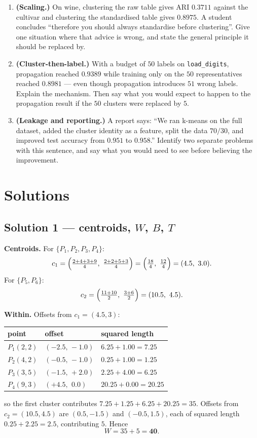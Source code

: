 \documentclass[11pt]{article}
\begin{document}
\begin{enumerate}[leftmargin=*]
  \item \textbf{(Scaling.)} On wine, clustering the raw table gives ARI
    $0.3711$ against the cultivar and clustering the standardised table gives
    $0.8975$. A student concludes ``therefore you should always
    standardise before clustering''. Give one situation where that advice is
    wrong, and state the general principle it should be replaced by.

  \item \textbf{(Cluster-then-label.)} With a budget of $50$ labels on
    \texttt{load\_digits}, propagation reached $0.9389$ while training only on
    the $50$ representatives reached $0.8981$ --- even though propagation
    introduces $51$ wrong labels. Explain the mechanism. Then say what you
    would expect to happen to the propagation result if the $50$ clusters were
    replaced by $5$.

  \item \textbf{(Leakage and reporting.)} A report says: ``We ran k-means on
    the full dataset, added the cluster identity as a feature, split the data
    $70/30$, and improved test accuracy from $0.951$ to $0.958$.'' Identify
    two separate problems with this sentence, and say what you would need to
    see before believing the improvement.
\end{enumerate}

\section{Solutions}
\label{sec:solutions}

\subsection*{Solution 1 --- centroids, $W$, $B$, $T$}

\textbf{Centroids.} For $\{P_1,P_2,P_3,P_4\}$:
\[
  c_1 = \Bigl(\tfrac{2+4+3+9}{4},\ \tfrac{2+2+5+3}{4}\Bigr)
      = \Bigl(\tfrac{18}{4},\ \tfrac{12}{4}\Bigr) = (4.5,\ 3.0).
\]
For $\{P_5,P_6\}$:
\[
  c_2 = \Bigl(\tfrac{11+10}{2},\ \tfrac{3+6}{2}\Bigr) = (10.5,\ 4.5).
\]

\textbf{Within.} Offsets from $c_1 = (4.5,3)$:
\begin{center}
\begin{tabular}{@{}lll@{}}
  \toprule
  point & offset & squared length \\
  \midrule
  $P_1(2,2)$  & $(-2.5,\,-1.0)$ & $6.25 + 1.00 = 7.25$ \\
  $P_2(4,2)$  & $(-0.5,\,-1.0)$ & $0.25 + 1.00 = 1.25$ \\
  $P_3(3,5)$  & $(-1.5,\,+2.0)$ & $2.25 + 4.00 = 6.25$ \\
  $P_4(9,3)$  & $(+4.5,\,\ 0.0)$ & $20.25 + 0.00 = 20.25$ \\
  \bottomrule
\end{tabular}
\end{center}
so the first cluster contributes $7.25 + 1.25 + 6.25 + 20.25 = 35$. Offsets
from $c_2 = (10.5,4.5)$ are $(0.5,-1.5)$ and $(-0.5,1.5)$, each of squared
length $0.25 + 2.25 = 2.5$, contributing $5$. Hence
\[
  W = 35 + 5 = \mathbf{40}.
\]
\end{document}
